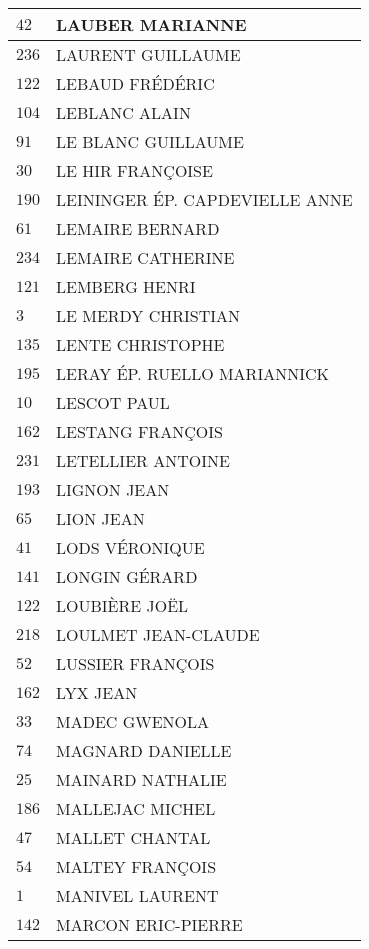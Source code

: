 \begin{xltabular}{\linewidth}{|l|X|}
    \hline
    $42$ & LAUBER MARIANNE \\
    \hline
    $236$ & LAURENT GUILLAUME \\
    \hline
    $122$ & LEBAUD FRÉDÉRIC \\
    \hline
    $104$ & LEBLANC ALAIN \\
    \hline
    $91$ & LE BLANC GUILLAUME \\
    \hline
    $30$ & LE HIR FRANÇOISE \\
    \hline
    $190$ & LEININGER ÉP. CAPDEVIELLE ANNE \\
    \hline
    $61$ & LEMAIRE BERNARD \\
    \hline
    $234$ & LEMAIRE CATHERINE \\
    \hline
    $121$ & LEMBERG HENRI \\
    \hline
    $3$ & LE MERDY CHRISTIAN \\
    \hline
    $135$ & LENTE CHRISTOPHE \\
    \hline
    $195$ & LERAY ÉP. RUELLO MARIANNICK \\
    \hline
    $10$ & LESCOT PAUL \\
    \hline
    $162$ & LESTANG FRANÇOIS \\
    \hline
    $231$ & LETELLIER ANTOINE \\
    \hline
    $193$ & LIGNON JEAN \\
    \hline
    $65$ & LION JEAN \\
    \hline
    $41$ & LODS VÉRONIQUE \\
    \hline
    $141$ & LONGIN GÉRARD \\
    \hline
    $122$ & LOUBIÈRE JOËL \\
    \hline
    $218$ & LOULMET JEAN-CLAUDE \\
    \hline
    $52$ & LUSSIER FRANÇOIS \\
    \hline
    $162$ & LYX JEAN \\
    \hline
    $33$ & MADEC GWENOLA \\
    \hline
    $74$ & MAGNARD DANIELLE \\
    \hline
    $25$ & MAINARD NATHALIE \\
    \hline
    $186$ & MALLEJAC MICHEL \\
    \hline
    $47$ & MALLET CHANTAL \\
    \hline
    $54$ & MALTEY FRANÇOIS \\
    \hline
    $1$ & MANIVEL LAURENT \\
    \hline
    $142$ & MARCON ERIC-PIERRE \\

\end{xltabular}
